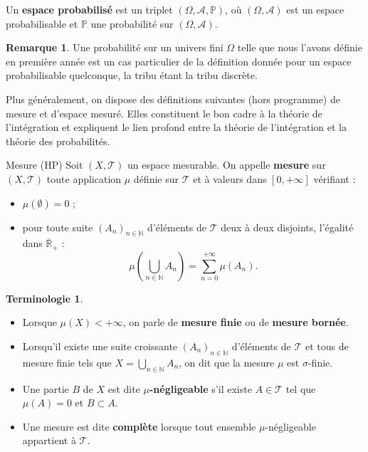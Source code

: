 \documentclass[french]{article}
\renewcommand{\P}{\mathbb{P}}
\newcommand{\N}{\mathbb{N}}
\newcommand{\R}{\mathbb{R}}
\theoremstyle{plain}
\theoremstyle{definition}
\newtheorem*{rmq}{Remarque}
\newtheorem*{terminologie}{Terminologie}
\theoremstyle{remark}
\begin{document}
\begin{dfn}
	Un \textbf{espace probabilisé} est un triplet $(\Omega,\mathcal{A},\P)$, où $(\Omega,\mathcal{A})$ est un espace probabilisable et $\P$ une probabilité sur $(\Omega,\mathcal{A})$.
\end{dfn}

\begin{rmq}
	Une probabilité sur un univers fini $\Omega$ telle que nous l'avons définie en première année est un cas particulier de la définition donnée pour un espace probabilisable quelconque, la tribu étant la tribu discrète.
\end{rmq}

Plus généralement, on dispose des définitions suivantes (hors programme) de mesure et d'espace mesuré. Elles constituent le bon cadre à la théorie de l'intégration et expliquent le lien profond entre la théorie de l'intégration et la théorie des probabilités.

\begin{dfn}{Mesure (HP)}
	Soit $(X,\mathcal{T})$ un espace mesurable. On appelle \textbf{mesure} sur $(X,\mathcal{T})$ toute application $\mu$ définie sur $\mathcal{T}$ et à valeurs dans $[0,+\infty]$ vérifiant :
	\begin{itemize}
		\item $\mu(\emptyset)=0$ ;
		\item pour toute suite $(A_n)_{n\in\N}$ d'éléments de $\mathcal{T}$ deux à deux disjoints, l'égalité dans $\overline{\R}_+$ :
		$$\mu\left(\bigcup_{n\in\N}A_n\right)=\sum_{n=0}^{+\infty}\mu(A_n).$$
	\end{itemize}
\end{dfn}

\begin{terminologie}
	\begin{itemize}
		\item Lorsque $\mu(X)<+\infty$, on parle de \textbf{mesure finie} ou de \textbf{mesure bornée}.
		\item Lorsqu'il existe une suite croissante $(A_n)_{n\in\N}$ d'éléments de $\mathcal{T}$ et tous de mesure finie tels que $X=\displaystyle\bigcup_{n\in\N}A_n$, on dit que la mesure $\mu$ est $\sigma$-finie.
		\item Une partie $B$ de $X$ est dite \textbf{$\mu$-négligeable} s'il existe $A\in\mathcal{T}$ tel que $\mu(A)=0$ et $B\subset A$.
		\item Une mesure est dite \textbf{complète} lorsque tout ensemble $\mu$-négligeable appartient à $\mathcal{T}$.
	\end{itemize}
\end{terminologie}
\end{document}
